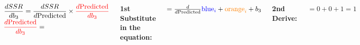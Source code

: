 \documentclass[aspectratio=169]{beamer}
\begin{document}
\begin{frame}[fragile]
\begin{columns}
    \vspace{3mm}
    $\displaystyle \frac{d SSR}{d b_3} = \frac{d SSR}{d \mathrm{Predicted}} \times \textcolor{red}{\frac{d \mathrm{Predicted}}{d b_3}}$
    \pause
    $\displaystyle \textcolor{red}{\frac{d \mathrm{Predicted}}{d b_3}} =$
    
    \vspace{3mm}
    \textbf{1st Substitute in the equation:}
    
    \vspace{3mm}
    $ = \frac{d}{d \mathrm{Predicted}}  \textcolor{blue}{\mathrm{blue}_i} + \textcolor{orange}{\mathrm{orange}_i} + b_3$ \pause
    
    \vspace{3mm}
    \textbf{2nd Derive:}
    
    \vspace{3mm}
    $\displaystyle =  0 + 0 + 1 = 1$

    
\end{columns}
\end{frame}
\end{document}
